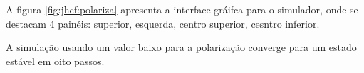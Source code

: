 A figura \ref{fig:jhcf:polariza} apresenta a interface gráifca para o simulador, onde se destacam 4 painéis: superior, esquerda, centro superior, cesntro inferior.

A simulação usando um valor baixo para a polarização converge para um estado estável em oito passos.








